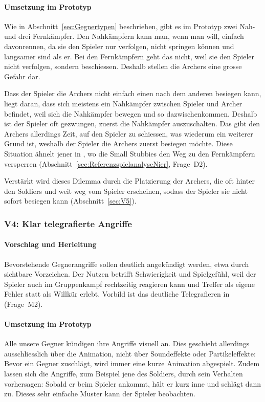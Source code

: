 \documentclass[../Main.tex]{subfiles}
\begin{document}
\paragraph{Umsetzung im Prototyp}
Wie in Abschnitt~\ref{sec:Gegnertypen} beschrieben, gibt es im Prototyp zwei Nah- und drei Fernkämpfer. Den Nahkämpfern kann man, wenn man will, einfach davonrennen, da sie den Spieler nur verfolgen, nicht springen können und langsamer sind als er. Bei den Fernkämpfern geht das nicht, weil sie den Spieler nicht verfolgen, sondern beschiessen. Deshalb stellen die Archers eine grosse Gefahr dar.

Dass der Spieler die Archers nicht einfach einen nach dem anderen besiegen kann, liegt daran, dass sich meistens ein Nahkämpfer zwischen Spieler und Archer befindet, weil sich die Nahkämpfer bewegen und so dazwischenkommen. Deshalb ist der Spieler oft gezwungen, zuerst die Nahkämpfer auszuschalten. Das gibt den Archers allerdings Zeit, auf den Spieler zu schiessen, was wiederum ein weiterer Grund ist, weshalb der Spieler die Archers zuerst besiegen möchte. Diese Situation ähnelt jener in , wo die Small Stubbies den Weg zu den Fernkämpfern versperren (Abschnitt~\ref{sec:ReferenzspielanalyseNier}, Frage~D2).

Verstärkt wird dieses Dilemma durch die Platzierung der Archers, die oft hinter den Soldiers und weit weg vom Spieler erscheinen, sodass der Spieler sie nicht sofort besiegen kann (Abschnitt~\ref{sec:V5}).

\subsubsection{V4: Klar telegrafierte Angriffe} \label{sec:V4}

\paragraph{Vorschlag und Herleitung}
Bevorstehende Gegnerangriffe sollen deutlich angekündigt werden, etwa durch sichtbare Vorzeichen. Der Nutzen betrifft Schwierigkeit und Spielgefühl, weil der Spieler auch im Gruppenkampf rechtzeitig reagieren kann und Treffer als eigene Fehler statt als Willkür erlebt. Vorbild ist das deutliche Telegrafieren in  (Frage~M2).

\paragraph{Umsetzung im Prototyp}
Alle unsere Gegner kündigen ihre Angriffe visuell an. Dies geschieht allerdings ausschliesslich über die Animation, nicht über Soundeffekte oder Partikeleffekte: Bevor ein Gegner zuschlägt, wird immer eine kurze Animation abgespielt. Zudem lassen sich die Angriffe, zum Beispiel jene des Soldiers, durch sein Verhalten vorhersagen: Sobald er beim Spieler ankommt, hält er kurz inne und schlägt dann zu. Dieses sehr einfache Muster kann der Spieler beobachten.
\end{document}
